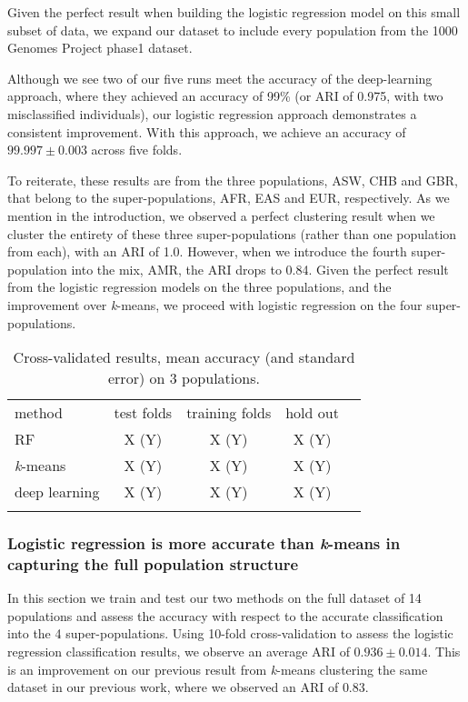 \documentclass{llncs}
\newcommand{\kMeans}{\textit{k}-means}
\begin{document}
{Given the perfect result when building the logistic regression model on this small subset of data, we expand our dataset
to include every population from the 1000 Genomes Project phase1 dataset.

Although we see two of our five runs meet the accuracy of the deep-learning approach, where they achieved an accuracy of
99\% (or ARI of 0.975, with two misclassified individuals), our logistic regression approach demonstrates a consistent
improvement.  With this approach, we achieve an accuracy of \(99.997 \pm 0.003\) across five folds.

To reiterate, these results are from the three populations, ASW, CHB and GBR, that belong to the super-populations, AFR,
EAS and EUR, respectively.  As we mention in the introduction, we observed a perfect clustering result when we cluster
the entirety of these three super-populations (rather than one population from each), with an ARI of 1.0. However, when
we introduce the fourth super-population into the mix, AMR, the ARI drops to 0.84.  Given the perfect result from the
logistic regression models on the three populations, and the improvement over \kMeans{}, we proceed with logistic
regression on the four super-populations.


\begin{table}
\caption{Cross-validated results, mean accuracy (and standard error) on 3 populations.}
\begin{center}
\renewcommand{\arraystretch}{1.4}
\setlength\tabcolsep{3pt}
\begin{tabular}{lcccc}
\hline\noalign{\smallskip}
method  & test folds & training folds & hold out \\
RF  & X (Y) & X (Y) & X (Y) \\
\kMeans & X (Y) & X (Y) & X (Y) \\
deep learning & X (Y) & X (Y) & X (Y) \\
\noalign{\smallskip}
\hline
\end{tabular}
\end{center}
\end{table}

\subsubsection{Logistic regression is more accurate than \kMeans{} in capturing the full population structure}
In this section we train and test our two methods on the full dataset of 14 populations and assess the accuracy with respect to the accurate
classification into the 4 super-populations.
Using 10-fold cross-validation to assess the logistic regression classification results, we observe an average ARI of \(0.936 \pm{} 0.014\).
This is an improvement on our previous result from \kMeans{} clustering the same dataset in our previous work, where we observed an ARI of \(0.83\).

}
\end{document}
